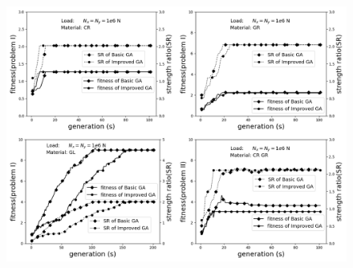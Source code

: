 \documentclass[Afour,sageh,times]{sagej}
\begin{document}
\begin{figure}
\begin{center}
  \includegraphics[width=\linewidth]{A_laminate_design_images/NxNy.png}
  \label{fig:NxNy}
\end{center}
\end{figure}
\end{document}
